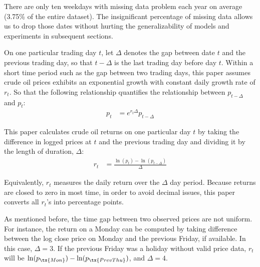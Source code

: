 \documentclass[12pt]{article}
\begin{document}
	\par There are only ten weekdays with missing data problem each year on average (3.75\% of the entire dataset). The insignificant percentage of missing data allows us to drop those dates without hurting the generalizability of models and experiments in subsequent sections.

	\par On one particular trading day $t$, let $\Delta$ denotes the gap between date $t$ and the previous trading day, so that $t - \Delta$ is the last trading day before day $t$. 
	Within a short time period such as the gap between two trading days, this paper assumes crude oil prices exhibits an exponential growth with constant daily growth rate of $r_t$.
	So that the following relationship quantifies the relationship between $p_{t-\Delta}$ and $p_t$:
	\begin{align}
		p_t &= e^{r_t \Delta} p_{t-\Delta}
	\end{align}
	
	\par This paper calculates crude oil returns on one particular day $t$ by taking the difference in logged prices at $t$ and the previous trading day and dividing it by the length of duration, $\Delta$:
	\begin{align}
		r_t &= \frac{\ln(p_t) - \ln(p_{t - \Delta})}{\Delta}
	\end{align}
	
	\par Equivalently, $r_t$ measures the daily return over the $\Delta$ day period. Because returns are closed to zero in most time, in order to avoid decimal issues, this paper converts all $r_t$'s into percentage points.
	
	\par As mentioned before, the time gap between two observed prices are not uniform.
	For instance, the return on a Monday can be computed by taking difference between the log close price on Monday and the previous Friday, if available. In this case, $\Delta = 3$. If the previous Friday was a holiday without valid price data, $r_t$ will be $\ln(p_\tx{Mon}) - \ln(p_{\tx{Prev Thu}})$, and $\Delta = 4$.
\end{document}
